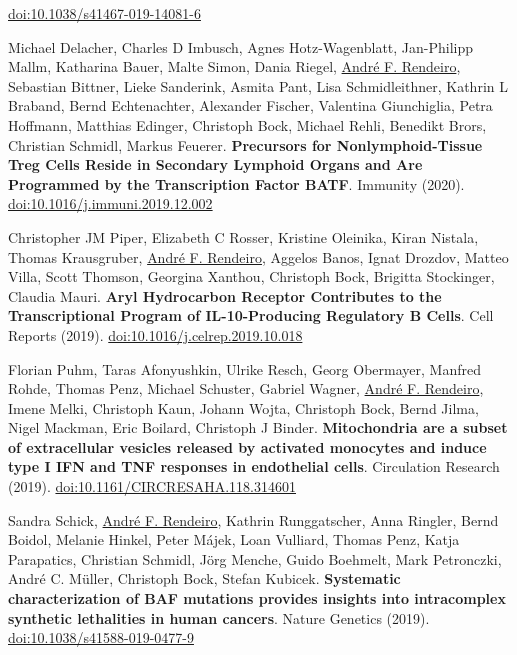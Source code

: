 \documentclass[11pt,a4paper,roman]{moderncv} %
\begin{document}
\begin{etaremune}[leftmargin=1.0cm, itemindent=0pt, topsep=10pt, itemsep=2pt, partopsep=0pt, parsep=0pt]
        \href{https://dx.doi.org/10.1038/s41467-019-14081-6}{doi:10.1038/s41467-019-14081-6}
        \item Michael Delacher, Charles D Imbusch, Agnes Hotz-Wagenblatt, Jan-Philipp Mallm, Katharina Bauer, Malte Simon, Dania Riegel, \underline{André F. Rendeiro}, Sebastian Bittner, Lieke Sanderink, Asmita Pant, Lisa Schmidleithner, Kathrin L Braband, Bernd Echtenachter, Alexander Fischer, Valentina Giunchiglia, Petra Hoffmann, Matthias Edinger, Christoph Bock, Michael Rehli, Benedikt Brors, Christian Schmidl, Markus Feuerer. \textbf{Precursors for Nonlymphoid-Tissue Treg Cells Reside in Secondary Lymphoid Organs and Are Programmed by the Transcription Factor BATF}. Immunity (2020).
        \href{https://dx.doi.org/doi:10.1016/j.immuni.2019.12.002}{doi:10.1016/j.immuni.2019.12.002}
        \item Christopher JM Piper, Elizabeth C Rosser, Kristine Oleinika, Kiran Nistala, Thomas Krausgruber, \underline{André F. Rendeiro}, Aggelos Banos, Ignat Drozdov, Matteo Villa, Scott Thomson, Georgina Xanthou, Christoph Bock, Brigitta Stockinger, Claudia Mauri. \textbf{Aryl Hydrocarbon Receptor Contributes to the Transcriptional Program of IL-10-Producing Regulatory B Cells}. Cell Reports (2019).
        \href{https://dx.doi.org/10.1016/j.celrep.2019.10.018}{doi:10.1016/j.celrep.2019.10.018}
        \item Florian Puhm, Taras Afonyushkin, Ulrike Resch, Georg Obermayer, Manfred Rohde, Thomas Penz, Michael Schuster, Gabriel Wagner, \underline{André F. Rendeiro}, Imene Melki, Christoph Kaun, Johann Wojta, Christoph Bock, Bernd Jilma, Nigel Mackman, Eric Boilard, Christoph J Binder. \textbf{Mitochondria are a subset of extracellular vesicles released by activated monocytes and induce type I IFN and TNF responses in endothelial cells}. Circulation Research (2019).
        \href{https://dx.doi.org/10.1161/CIRCRESAHA.118.314601}{doi:10.1161/CIRCRESAHA.118.314601}
        \item Sandra Schick, \underline{André F. Rendeiro}, Kathrin Runggatscher, Anna Ringler, Bernd Boidol, Melanie Hinkel, Peter Májek, Loan Vulliard, Thomas Penz, Katja Parapatics, Christian Schmidl, Jörg Menche, Guido Boehmelt, Mark Petronczki, André C. Müller, Christoph Bock, Stefan Kubicek. \textbf{Systematic characterization of BAF mutations provides insights into intracomplex synthetic lethalities in human cancers}. Nature Genetics (2019).
        \href{https://dx.doi.org/10.1038/s41588-019-0477-9}{doi:10.1038/s41588-019-0477-9}

\end{etaremune}
\end{document}
